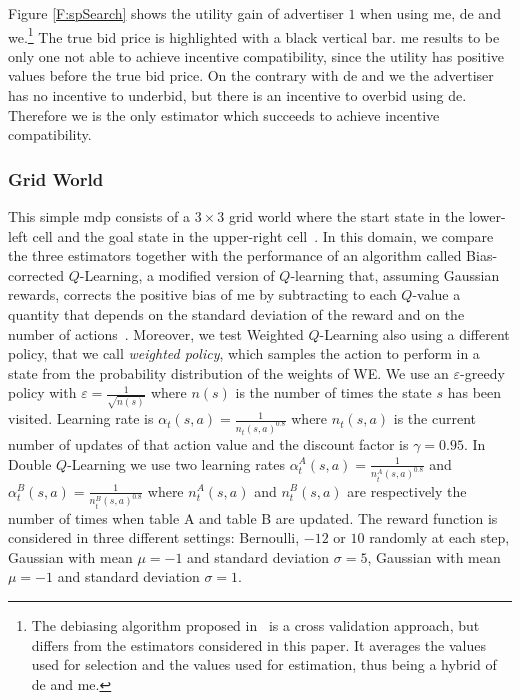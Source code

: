Figure \ref{F:spSearch} shows the utility gain of advertiser $1$ when using \gls{me}, \gls{de} and \gls{we}.\footnote{The debiasing algorithm proposed in~\cite{xu2013mab} is a cross validation approach, but differs from the estimators considered in this paper. It averages the values used for selection and the values used for estimation, thus being a hybrid of \gls{de} and \gls{me}.}
The true bid price is highlighted with a black vertical bar. \gls{me} results to be only one not able to achieve incentive compatibility, since the utility has positive values before the true bid price. On the contrary with \gls{de} and \gls{we} the advertiser has no incentive to underbid, but there is an incentive to overbid using \gls{de}. Therefore \gls{we} is the only estimator which succeeds to achieve incentive compatibility.

\subsubsection{Grid World}
This simple \gls{mdp} consists of a $3 \times 3$ grid world where the start state in the lower-left cell and the goal state in the upper-right cell~\cite{van2010double}. 
In this domain, we compare the three estimators together with the performance of an algorithm called Bias-corrected $Q$-Learning, a modified version of $Q$-learning that, assuming Gaussian rewards, corrects the positive bias of \gls{me} by subtracting to each $Q$-value a quantity that depends on the standard deviation of the reward and on the number of actions~\cite{lee2012intelligent,lee2013bias}. Moreover, we test Weighted $Q$-Learning also using a different policy, that we call \textit{weighted policy}, which samples the action to perform in a state from the probability distribution of the weights of WE.
We use an $\varepsilon$-greedy policy with $\varepsilon = \frac{1}{\sqrt{n(s)}}$ where $n(s)$ is the number of times the state $s$ has been visited.
Learning rate is $\alpha_t(s, a) = \frac{1}{n_t(s, a)^{0.8}}$ where $n_t(s, a)$ is the current number of updates of that action value and the discount factor is $\gamma = 0.95$. 
In Double $Q$-Learning we use two learning rates $\alpha_t^A(s, a) = \frac{1}{n_t^A(s, a)^{0.8}}$ and $\alpha_t^B(s, a) = \frac{1}{n_t^B(s, a)^{0.8}}$ where $n_t^A(s, a)$ and $n_t^B(s, a)$ are respectively the number of times when table A and table B are updated. 
The reward function is considered in three different settings: Bernoulli, $-12$ or $10$ randomly at each step, Gaussian with mean $\mu = -1$ and standard deviation $\sigma = 5$, Gaussian with mean $\mu = -1$ and standard deviation $\sigma = 1$. 
